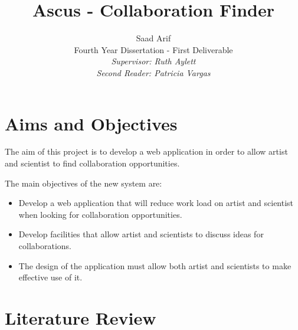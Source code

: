 \documentclass[a4paper,oneside,11pt]{report}
\begin{document}
\title{Ascus - Collaboration Finder}
\author{Saad Arif\\Fourth Year Dissertation - First Deliverable \\ \em Supervisor: Ruth Aylett \\ \em Second Reader: Patricia Vargas}
\maketitle
\pagestyle{empty} %
\tableofcontents %
\cleardoublepage %
\pagestyle{plain} %
\setcounter{page}{1} %

\chapter{Aims and Objectives}

The aim of this project is to develop a web application in order to allow artist and scientist to find collaboration opportunities.

The main objectives of the new system are:
\begin{itemize}
	\item Develop a web application that will reduce work load on artist and scientist when looking for collaboration opportunities.
	\item Develop facilities that allow artist and scientists to discuss ideas for collaborations.
	\item The design of the application must allow both artist and scientists to make effective use of it.
\end{itemize}
	
\chapter{Literature Review}
\end{document}
